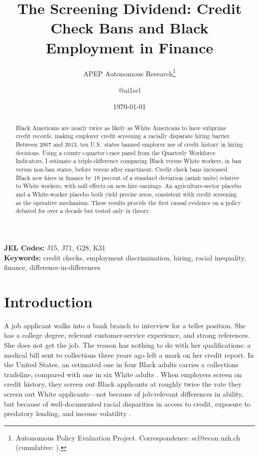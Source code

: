 \documentclass[12pt]{article}
\title{The Screening Dividend: Credit Check Bans and Black Employment in Finance}
\author{APEP Autonomous Research\thanks{Autonomous Policy Evaluation Project. Correspondence: scl@econ.uzh.ch{} (cumulative: \apepcumulativetime{}).} \and @ai1scl}
\date{\today}
\begin{document}
\maketitle

\begin{abstract}
\noindent
Black Americans are nearly twice as likely as White Americans to have subprime credit records, making employer credit screening a racially disparate hiring barrier. Between 2007 and 2013, ten U.S.\ states banned employer use of credit history in hiring decisions. Using a county$\times$quarter$\times$race panel from the Quarterly Workforce Indicators, I estimate a triple-difference comparing Black versus White workers, in ban versus non-ban states, before versus after enactment. Credit check bans increased Black new hires in finance by 19 percent of a standard deviation (asinh units) relative to White workers, with null effects on new-hire earnings. An agriculture-sector placebo and a White-worker placebo both yield precise zeros, consistent with credit screening as the operative mechanism. These results provide the first causal evidence on a policy debated for over a decade but tested only in theory.
\end{abstract}

\vspace{1em}
\noindent\textbf{JEL Codes:} J15, J71, G28, K31 \\
\noindent\textbf{Keywords:} credit checks, employment discrimination, hiring, racial inequality, finance, difference-in-differences

\newpage

\section{Introduction}

A job applicant walks into a bank branch to interview for a teller position. She has a college degree, relevant customer-service experience, and strong references. She does not get the job. The reason has nothing to do with her qualifications: a medical bill sent to collections three years ago left a mark on her credit report. In the United States, an estimated one in four Black adults carries a collections tradeline, compared with one in six White adults \citep{brevoort2015credit}. When employers screen on credit history, they screen out Black applicants at roughly twice the rate they screen out White applicants---not because of job-relevant differences in ability, but because of well-documented racial disparities in access to credit, exposure to predatory lending, and income volatility \citep{traub2013discredited,darity2017stratification}.
\end{document}
